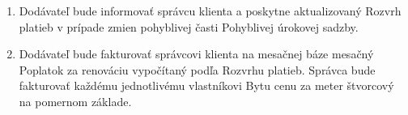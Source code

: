 \begin{enumerate}[label=\arabic*.]

\begin{center}
\end{center}
	\item Dodávateľ bude informovať správcu klienta a poskytne aktualizovaný Rozvrh platieb v prípade zmien pohyblivej časti Pohyblivej úrokovej sadzby.
	\item Dodávateľ bude fakturovať správcovi klienta na mesačnej báze mesačný Poplatok za renováciu vypočítaný podľa Rozvrhu platieb. Správca bude fakturovať každému jednotlivému vlastníkovi Bytu cenu za meter štvorcový na pomernom základe.
\end{enumerate}
